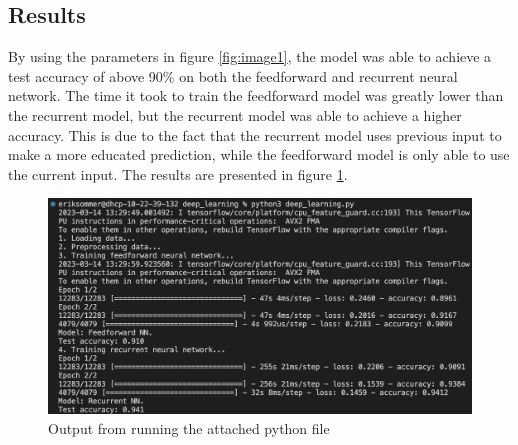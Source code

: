 \documentclass{article}
\begin{document}
\newpage

\subsection*{Results}

By using the parameters in figure \ref{fig:image1}, the model was able to achieve a test accuracy of above 90\% on both the feedforward and recurrent neural network.
The time it took to train the feedforward model was greatly lower than the recurrent model, but the recurrent model was able to achieve a higher accuracy.
This is due to the fact that the recurrent model uses previous input to make a more educated prediction, while the feedforward model is only able to use the current input.
The results are presented in figure \ref{fig:image2}.

\begin{figure}[hbtp]
    \centering
    \includegraphics[width=\linewidth]{output.png}
    \caption{Output from running the attached python file}
    \label{fig:image2}
\end{figure}
\end{document}

